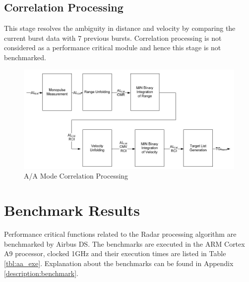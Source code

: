 \subsection{Correlation Processing}
This stage resolves the ambiguity in distance and velocity by comparing the current burst data with 7 previous bursts. Correlation processing is not considered as a performance critical module and hence this stage is not benchmarked. 

\begin{figure}[h!]
	\centering
	\includegraphics[width=140mm]{figures/aa_corr}
	\caption{A/A Mode Correlation Processing}
	\label{fig:bg_related_work:aa_corr}
\end{figure}
\FloatBarrier

\section{Benchmark Results}
\label{sec:ch2:benchmark_results}
Performance critical functions related to the Radar processing algorithm are benchmarked by Airbus DS. The benchmarks are executed in the ARM Cortex A9 processor, clocked 1GHz and their execution times are listed in Table \ref{tbl:aa_exe}. Explanation about the benchmarks can be found in Appendix \ref{description:benchmark}.

